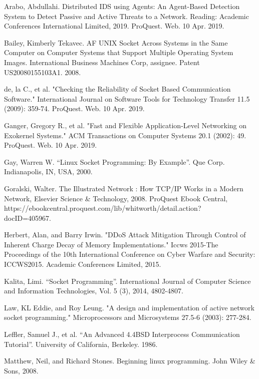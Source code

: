 \documentclass[conference, 12pt]{IEEEtran}
\begin{document}
\begin{thebibliography}{00}
Arabo, Abdullahi. Distributed IDS using Agents: An Agent-Based Detection System to Detect Passive and Active Threats to a Network. Reading: Academic Conferences International Limited, 2019. ProQuest. Web. 10 Apr. 2019.
 
Bailey, Kimberly Tekavec. AF UNIX Socket Across Systems in the Same Computer on Computer Systems that Support Multiple Operating System Images. International Business Machines Corp, assignee. Patent US20080155103A1. 2008.
    
de, la C., et al. "Checking the Reliability of Socket Based Communication Software." International Journal on Software Tools for Technology Transfer 11.5 (2009): 359-74. ProQuest. Web. 10 Apr. 2019.
     
Ganger, Gregory R., et al. "Fast and Flexible Application-Level Networking on Exokernel Systems." ACM Transactions on Computer Systems 20.1 (2002): 49. ProQuest. Web. 10 Apr. 2019.
     
Gay, Warren W. “Linux Socket Programming: By Example”. Que Corp. Indianapolis, IN, USA, 2000.
     
Goralski, Walter. The Illustrated Network : How TCP/IP Works in a Modern Network, Elsevier Science \& Technology, 2008. ProQuest Ebook Central, https://ebookcentral.proquest.com/lib/whitworth/detail.action?\\docID=405967.

Herbert, Alan, and Barry Irwin. "DDoS Attack Mitigation Through Control of Inherent Charge Decay of Memory Implementations." Iccws 2015-The Proceedings of the 10th International Conference on Cyber Warfare and Security: ICCWS2015. Academic Conferences Limited, 2015.
     
Kalita, Limi. “Socket Programming”. International Journal of Computer Science and Information Technologies, Vol. 5 (3), 2014, 4802-4807.
     
Law, KL Eddie, and Roy Leung. "A design and implementation of active network socket programming." Microprocessors and Microsystems 27.5-6 (2003): 277-284.
     
Leffler, Samuel J., et al. “An Advanced 4.4BSD Interprocess Communication Tutorial”. University of California, Berkeley. 1986.
     
Matthew, Neil, and Richard Stones. Beginning linux programming. John Wiley \& Sons, 2008.
     

\end{thebibliography}
\end{document}

